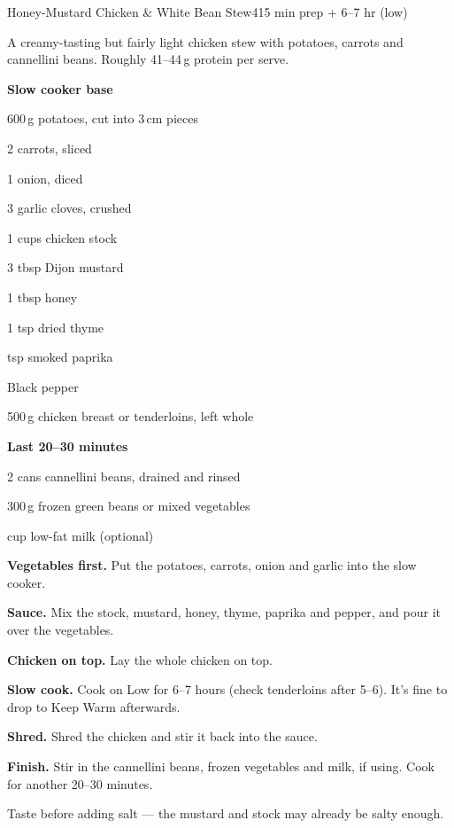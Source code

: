 \begin{recipebox}{Honey-Mustard Chicken \& White Bean Stew}{4}{15 min prep + 6--7 hr (low)}

A creamy-tasting but fairly light chicken stew with potatoes, carrots and
cannellini beans. Roughly 41--44\,g protein per serve.

\begin{ingredients}
  \item[] \textbf{Slow cooker base}
  \item 600\,g potatoes, cut into 3\,cm pieces
  \item 2 carrots, sliced
  \item 1 onion, diced
  \item 3 garlic cloves, crushed
  \item 1 cups chicken stock
  \item 3 tbsp Dijon mustard
  \item 1 tbsp honey
  \item 1 tsp dried thyme
  \item {} tsp smoked paprika
  \item Black pepper
  \item 500\,g chicken breast or tenderloins, left whole
  \item[] \textbf{Last 20--30 minutes}
  \item 2 cans cannellini beans, drained and rinsed
  \item 300\,g frozen green beans or mixed vegetables
  \item {} cup low-fat milk (optional)
\end{ingredients}

\begin{method}
  \item \textbf{Vegetables first.} Put the potatoes, carrots, onion and garlic into the slow cooker.
  \item \textbf{Sauce.} Mix the stock, mustard, honey, thyme, paprika and pepper, and pour it over the vegetables.
  \item \textbf{Chicken on top.} Lay the whole chicken on top.
  \item \textbf{Slow cook.} Cook on Low for 6--7 hours (check tenderloins after 5--6). It's fine to drop to Keep Warm afterwards.
  \item \textbf{Shred.} Shred the chicken and stir it back into the sauce.
  \item \textbf{Finish.} Stir in the cannellini beans, frozen vegetables and milk, if using. Cook for another 20--30 minutes.
  \item Taste before adding salt --- the mustard and stock may already be salty enough.
\end{method}


\end{recipebox}
